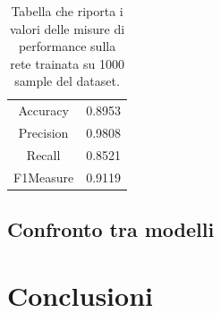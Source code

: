 \begin{table}
	\caption{Tabella che riporta i valori delle misure di performance sulla rete trainata su 1000 sample del dataset.}
	\label{tab:nnperformance}
	\centering
	\begin{tabular}{c|c}
		Accuracy & 0.8953  \\ 
		Precision & 0.9808  \\
		Recall & 0.8521  \\
		F1Measure & 0.9119  \\
	\end{tabular}
\end{table}

\subsection{Confronto tra modelli}
\section{Conclusioni}
